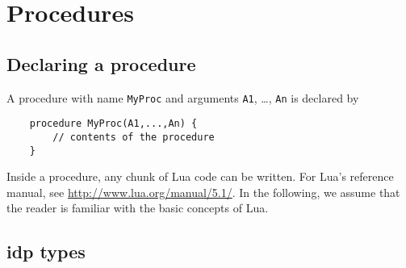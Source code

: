 \documentclass[a4]{article}
\newcommand{\idp}{{\sc idp}\xspace}
\begin{document}
\section{Procedures}

\subsection{Declaring a procedure}

A procedure with name {\tt MyProc} and arguments {\tt A1}, \ldots, {\tt An} is declared by 
\begin{lstlisting}
	procedure MyProc(A1,...,An) {
		// contents of the procedure
	}
\end{lstlisting}
Inside a procedure, any chunk of Lua code can be written. For Lua's reference manual, see \url{http://www.lua.org/manual/5.1/}. In the following, we assume that the reader is familiar with the basic concepts of Lua.

\subsection{\idp types}
\end{document}
